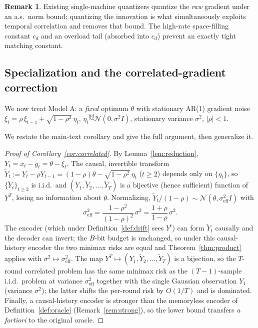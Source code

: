 \documentclass[11pt]{article}
\theoremstyle{definition}
\newtheorem{remark}{Remark}
\newcommand{\Ncal}{\mathcal{N}}
\begin{document}
\begin{remark}
Existing single-machine quantizers \citep[e.g.][]{alistarh2017qsgd} quantize the \emph{raw} gradient
under an a.s.\ norm bound; quantizing the innovation is what simultaneously exploits temporal correlation
and removes that bound. The high-rate space-filling constant $c_d$ and an overload tail (absorbed into
$c_d$) prevent an exactly tight matching constant.
\end{remark}

\subsection{Specialization and the correlated-gradient correction}\label{app:seqrd:correct}
We now treat Model A: a \emph{fixed} optimum $\theta$ with stationary AR(1) gradient noise
$\xi_t=\rho\,\xi_{t-1}+\sqrt{1-\rho^2}\,\eta_t$, $\eta_t\stackrel{\mathrm{iid}}{\sim}\Ncal(0,\sigma^2 I)$,
stationary variance $\sigma^2$, $|\rho|<1$.

We restate the main-text corollary and give the full argument, then generalize it.
\begin{proof}[Proof of Corollary~\ref{cor:correlated}]
By Lemma~\ref{lem:reduction}, $Y_t=x_t-g_t=\theta-\xi_t$. The causal, invertible transform
$\tilde Y_t:=Y_t-\rho Y_{t-1}=(1-\rho)\theta-\sqrt{1-\rho^2}\,\eta_t$ ($t\ge2$) depends only on
$\{\eta_t\}$, so $\{\tilde Y_t\}_{t\ge2}$ is i.i.d.\ and $(Y_1,\tilde Y_2,\dots,\tilde Y_T)$ is a bijective
(hence sufficient) function of $Y^T$, losing no information about $\theta$. Normalizing,
$\tilde Y_t/(1-\rho)\sim\Ncal(\theta,\sigma^2_{\mathrm{eff}}I)$ with
\[
\sigma^2_{\mathrm{eff}}=\frac{1-\rho^2}{(1-\rho)^2}\,\sigma^2=\frac{1+\rho}{1-\rho}\,\sigma^2.
\]
The encoder (which under Definition~\ref{def:drift} sees $Y^t$) can form $\tilde Y_t$ causally and the
decoder can invert; the $B$-bit budget is unchanged, so under this causal-history encoder the two
minimax risks are equal and Theorem~\ref{thm:product} applies with $\sigma^2\mapsto\sigma^2_{\mathrm{eff}}$.
The map $Y^T\mapsto(Y_1,\tilde Y_2,\dots,\tilde Y_T)$ is a bijection, so the $T$-round correlated problem
has the same minimax risk as the $(T\!-\!1)$-sample i.i.d.\ problem at variance
$\sigma^2_{\mathrm{eff}}$ together with the single Gaussian observation $Y_1$ (variance $\sigma^2$); the
latter shifts the per-round risk by $O(1/T)$ and is dominated. Finally, a causal-history encoder is
stronger than the memoryless encoder of Definition~\ref{def:oracle} (Remark~\ref{rem:strong}), so the
lower bound transfers \emph{a fortiori} to the original oracle.
\end{proof}
\end{document}
